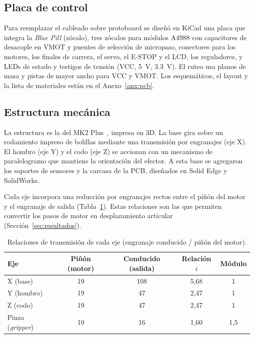 
\subsection{Placa de control}
Para reemplazar el cableado sobre protoboard se diseñó en KiCad una placa que integra la
\emph{Blue Pill} (zócalo), tres zócalos para módulos A4988 con capacitores de desacople en VMOT
y puentes de selección de micropaso, conectores para los motores, los finales de carrera, el
servo, el E-STOP y el LCD, los reguladores, y LEDs de estado y testigos de tensión (VCC,
\SI{5}{\volt}, \SI{3,3}{\volt}). El ruteo usa planos de masa y pistas de mayor ancho para VCC
y VMOT. Los esquemáticos, el layout y la lista de materiales están en el Anexo~\ref{anx:pcb}.


\subsection{Estructura mecánica}
La estructura es la del MK2 Plus~\cite{thingiverse}, impresa en 3D. La base gira sobre un
rodamiento impreso de bolillas mediante una transmisión por engranajes (eje X). El hombro
(eje Y) y el codo (eje Z) se accionan con un mecanismo de paralelogramo que mantiene la
orientación del efector. A esta base se agregaron los soportes de sensores y la carcasa de la
PCB, diseñados en Solid Edge y SolidWorks.

Cada eje incorpora una reducción por engranajes rectos entre el piñón del motor y el engranaje
de salida (Tabla~\ref{tab:transmision}). Estas relaciones son las que permiten convertir los
pasos de motor en desplazamiento articular (Sección~\ref{sec:resultados}).

\begin{table}[H]
\centering\small
\caption{Relaciones de transmisión de cada eje (engranaje conducido / piñón del motor).}\label{tab:transmision}
\begin{tabular}{@{}lcccc@{}}
\toprule
\textbf{Eje} & \textbf{Piñón (motor)} & \textbf{Conducido (salida)} & \textbf{Relación $i$} & \textbf{Módulo}\\
\midrule
X (base)               & 19 & 108 & 5,68 & 1\\
Y (hombro)             & 19 & 47  & 2,47 & 1\\
Z (codo)               & 19 & 47  & 2,47 & 1\\
Pinza (\emph{gripper}) & 10 & 16  & 1,60 & 1,5\\
\bottomrule
\end{tabular}
\end{table}
